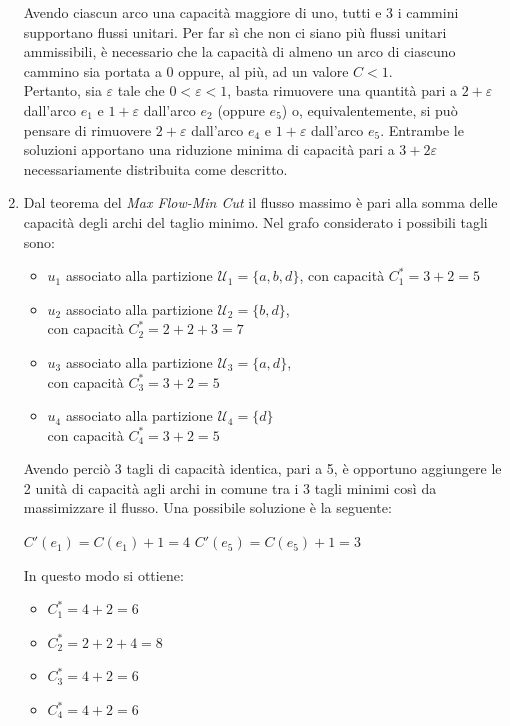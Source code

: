 \documentclass[13pt,largemargins]{homework}
\begin{document}
\begin{enumerate}[label=(\alph*)]
Avendo ciascun arco una capacità maggiore di uno, tutti e 3 i cammini supportano flussi unitari. Per far sì che non ci siano più flussi unitari ammissibili, è necessario che la capacità di almeno un arco di ciascuno cammino sia portata a 0 oppure, al più, ad un valore $C < 1$.\\Pertanto, sia $\varepsilon$ tale che $0 < \varepsilon< 1$, basta rimuovere una quantità pari a $2+\varepsilon$ dall'arco \(e_1\) e $1+\varepsilon$ dall'arco \(e_2\) (oppure \(e_5\)) o, equivalentemente, si può pensare di rimuovere $2+\varepsilon$ dall'arco \(e_4\) e $1+\varepsilon$ dall'arco \(e_5\). Entrambe le soluzioni apportano una riduzione minima di capacità pari a $3 + 2\varepsilon$ necessariamente distribuita come descritto. 
\item %
Dal teorema del \textit{Max Flow-Min Cut} il flusso massimo è pari alla somma delle capacità degli archi del taglio minimo. Nel grafo considerato i possibili tagli sono:
\begin{itemize}
\item $u_1$ associato alla partizione $\mathcal{U}_1=\{a,b,d\}$, con capacità $C^*_1=3+2=5$
\item $u_2$ associato alla partizione $\mathcal{U}_2=\{b,d\}$, \\con capacità $C^*_2=2+2+3=7$
\item $u_3$ associato alla partizione $\mathcal{U}_3=\{a,d\}$, \\con capacità $C^*_3=3+2=5$
\item $u_4$ associato alla partizione $\mathcal{U}_4=\{d\}$ \\con capacità $C^*_4=3+2=5$
\end{itemize}
Avendo perciò 3 tagli di capacità identica, pari a 5, è opportuno aggiungere le 2 unità di capacità agli archi in comune tra i 3 tagli minimi così da massimizzare il flusso. Una possibile soluzione è la seguente: 
\begin{center} 
$C'(e_1) = C(e_1)+1 = 4$ \quad $C'(e_5) = C(e_5)+1 = 3$
\end{center}

In questo modo si ottiene: 
\begin{itemize}
\item $C^*_1=4+2=6$
\item $C^*_2=2+2+4=8$
\item $C^*_3=4+2=6$
\item $C^*_4=4+2=6$\\
\end{itemize} 



\end{enumerate}
\end{document}
